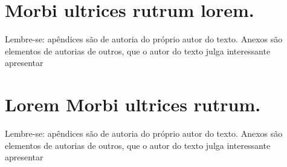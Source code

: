 \documentclass[
	12pt,				%
	openright,			%
	oneside,			%
	a4paper,			%
	english,			%
	brazil				%
	]{abntex2}
\begin{document}
\begin{anexosenv}


\chapter{Morbi ultrices rutrum lorem.}
Lembre-se: apêndices são de autoria do próprio autor do texto. Anexos são elementos de autorias de outros, que o autor do texto julga interessante apresentar

\chapter{Lorem Morbi ultrices rutrum.}
Lembre-se: apêndices são de autoria do próprio autor do texto. Anexos são elementos de autorias de outros, que o autor do texto julga interessante apresentar

\end{anexosenv}

\printindex
\end{document}
